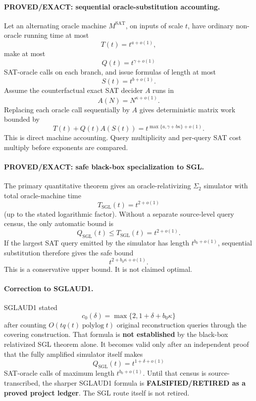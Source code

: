 \documentclass[11pt]{article}
\begin{document}
\paragraph{PROVED/EXACT: sequential oracle-substitution accounting.}
Let an alternating oracle machine \(M^{\mathrm{SAT}}\), on inputs of scale \(t\), have ordinary non-oracle running time at most
\[
T(t)=t^{a+o(1)},
\]
make at most
\[
Q(t)=t^{\gamma+o(1)}
\]
SAT-oracle calls on each branch, and issue formulas of length at most
\[
S(t)=t^{b+o(1)}.
\]
Assume the counterfactual exact SAT decider \(A\) runs in
\[
A(N)=N^{\kappa+o(1)}.
\]
Replacing each oracle call sequentially by \(A\) gives deterministic matrix work bounded by
\[
\boxed{
T(t)+Q(t)A(S(t))
=
t^{\max\{a,\gamma+b\kappa\}+o(1)}.
}
\]
This is direct machine accounting. Query multiplicity and per-query SAT cost multiply before exponents are compared.

\paragraph{PROVED/EXACT: safe black-box specialization to SGL.}
The primary quantitative theorem gives an oracle-relativizing \(\Sigma_2\) simulator with total oracle-machine time
\[
T_{\mathrm{SGL}}(t)=t^{2+o(1)}
\]
(up to the stated logarithmic factor). Without a separate source-level query census, the only automatic bound is
\[
Q_{\mathrm{SGL}}(t)\le T_{\mathrm{SGL}}(t)=t^{2+o(1)}.
\]
If the largest SAT query emitted by the simulator has length \(t^{b_0+o(1)}\), sequential substitution therefore gives the safe bound
\[
\boxed{
t^{2+b_0\kappa+o(1)}.
}
\]
This is a conservative upper bound. It is not claimed optimal.

\paragraph{Correction to SGLAUD1.}
SGLAUD1 stated
\[
c_0(\delta)=\max\{2,1+\delta+b_0\kappa\}
\]
after counting \(O(tq(t)\operatorname{polylog}t)\) original reconstruction queries through the covering construction. That formula is \textbf{not established} by the black-box relativized SGL theorem alone. It becomes valid only after an independent proof that the fully amplified simulator itself makes
\[
Q_{\mathrm{SGL}}(t)=t^{1+\delta+o(1)}
\]
SAT-oracle calls of maximum length \(t^{b_0+o(1)}\). Until that census is source-transcribed, the sharper SGLAUD1 formula is \textbf{FALSIFIED/RETIRED as a proved project ledger}. The SGL route itself is not retired.
\end{document}

